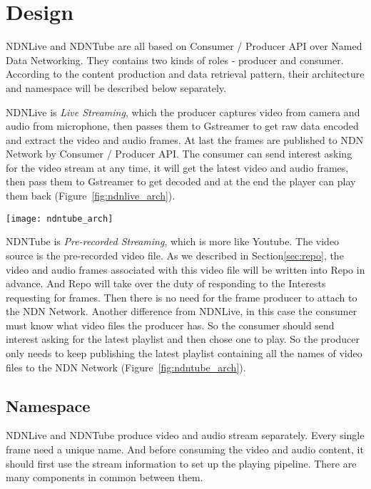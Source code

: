\vspace{0.3cm}
\section{Design} %
\label{sec:arch}
NDNLive and NDNTube are all based on Consumer / Producer API over Named Data Networking. They contains two kinds of roles - producer and consumer. According to the content production and data retrieval pattern, their architecture and namespace will be described below separately. 

NDNLive is \textit{Live Streaming}, which the producer captures video from camera and audio from microphone, then passes them to Gstreamer to get raw data encoded and extract the video and audio frames. At last the frames are published to NDN Network by Consumer / Producer API. The consumer can send interest asking for the video stream at any time, it will get the latest video and audio frames, then pass them to Gstreamer to get decoded and at the end the player can play them back (Figure~\ref{fig:ndnlive_arch}). 

\begin{figure*}[htbp]
  \centering
  \texttt{[image: ndntube\_arch]}
  \caption{NDNTube Architecture}
  \label{fig:ndntube_arch}
\end{figure*}
NDNTube is \textit{Pre-recorded Streaming}, which is more like Youtube. The video source is the pre-recorded video file. As we described in Section\ref{sec:repo}, the video and audio frames associated with this video file will be written into Repo in advance. And Repo will take over the duty of responding to the Interests requesting for frames. Then there is no need for the frame producer to attach to the NDN Network. Another difference from NDNLive, in this case the consumer must know what video files the producer has. So the consumer should send interest asking for the latest playlist and then chose one to play. So the producer only needs to keep publishing the latest playlist containing all the names of video files to the NDN Network (Figure~\ref{fig:ndntube_arch}).

\subsection{Namespace}

NDNLive and NDNTube produce video and audio stream separately. Every single frame need a unique name. And before consuming the video and audio content, it should first use the stream information to set up the playing pipeline. There are many components in common between them. 

